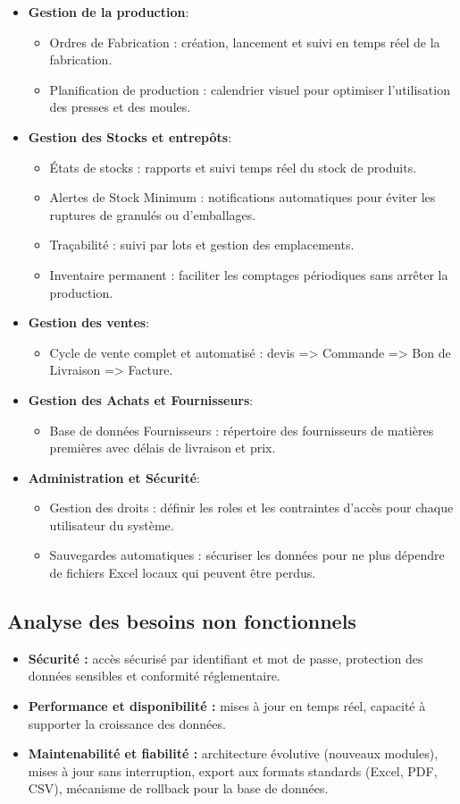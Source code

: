 \begin{itemize}
\item \textbf{ Gestion de la production}:
\begin{itemize}
\item Ordres de Fabrication : création, lancement et suivi en temps réel de la fabrication.
\item Planification de production : calendrier visuel pour optimiser l'utilisation des presses et des moules.
\end{itemize}
\item \textbf{ Gestion des Stocks et entrepôts}:
\begin{itemize}
\item États de stocks : rapports et suivi temps réel du stock de produits.
\item Alertes de Stock Minimum : notifications automatiques pour éviter les ruptures de granulés ou d'emballages.
\item Traçabilité : suivi par lots et gestion des emplacements.
\item Inventaire permanent : faciliter les comptages périodiques sans arrêter la production.
\end{itemize}
\item \textbf{ Gestion des ventes}:
\begin{itemize}
\item Cycle de vente complet et automatisé : devis => Commande => Bon de Livraison => Facture.
\end{itemize}
\item \textbf{ Gestion des Achats et Fournisseurs}:
\begin{itemize}
\item Base de données Fournisseurs : répertoire des fournisseurs de matières premières avec délais de livraison et prix.
\end{itemize}
\item \textbf{ Administration et Sécurité}:
\begin{itemize}
\item Gestion des droits : définir les roles et les contraintes d'accès pour chaque utilisateur du système.
\item Sauvegardes automatiques : sécuriser les données pour ne plus dépendre de fichiers Excel locaux qui peuvent être perdus.
\end{itemize}
\end{itemize}
\subsection{Analyse des besoins non fonctionnels}
\begin{itemize}
\item \textbf{Sécurité :} accès sécurisé par identifiant et mot de passe, protection des données sensibles et conformité réglementaire.
\item \textbf{Performance et disponibilité :} mises à jour en temps réel, capacité à supporter la croissance des données.
\item \textbf{Maintenabilité et fiabilité :} architecture évolutive (nouveaux modules), mises à jour sans interruption, export aux formats standards (Excel, PDF, CSV), mécanisme de rollback pour la base de données.
\end{itemize}

